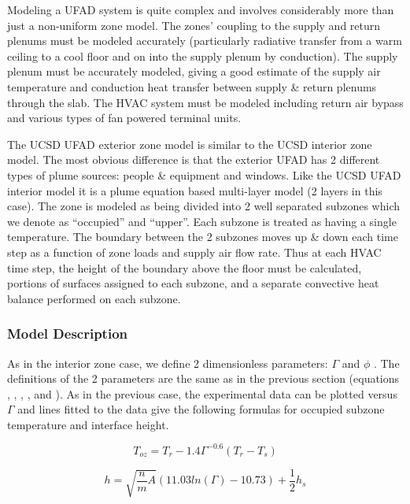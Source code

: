 Modeling a UFAD system is quite complex and involves considerably more than just a non-uniform zone model. The zones' coupling to the supply and return plenums must be modeled accurately (particularly radiative transfer from a warm ceiling to a cool floor and on into the supply plenum by conduction). The supply plenum must be accurately modeled, giving a good estimate of the supply air temperature and conduction heat transfer between supply \& return plenums through the slab. The HVAC system must be modeled including return air bypass and various types of fan powered terminal units.

The UCSD UFAD exterior zone model is similar to the UCSD interior zone model. The most obvious difference is that the exterior UFAD has 2 different types of plume sources: people \& equipment and windows. Like the UCSD UFAD interior model it is a plume equation based multi-layer model (2 layers in this case). The zone is modeled as being divided into 2 well separated subzones which we denote as ``occupied'' and ``upper''. Each subzone is treated as having a single temperature. The boundary between the 2 subzones moves up \& down each time step as a function of zone loads and supply air flow rate. Thus at each HVAC time step, the height of the boundary above the floor must be calculated, portions of surfaces assigned to each subzone, and a separate convective heat balance performed on each subzone.

\subsubsection{Model Description}\label{model-description-2-001}

As in the interior zone case, we define 2 dimensionless parameters: \(\Gamma\) and \(\phi\) . The definitions of the 2 parameters are the same as in the previous section (equations , , , , and ). As in the previous case, the experimental data can be plotted versus \(\Gamma\) and lines fitted to the data give the following formulas for occupied subzone temperature and interface height.

\begin{equation}
{T_{oz}} = {T_r} - 1.4{\Gamma ^{ - 0.6}}({T_r} - {T_s})
\end{equation}

\begin{equation}
h = \sqrt {\frac{n}{m}A} (11.03ln(\Gamma ) - 10.73) + \frac{1}{2}{h_s}
\end{equation}


